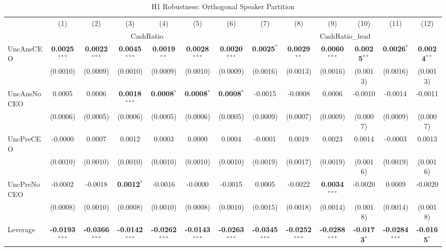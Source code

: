 \begin{landscape}
\begin{table}[H]
\setlength{\tabcolsep}{3pt}
\renewcommand{\arraystretch}{0.85}
\centering
\caption{H1 Robustness: Orthogonal Speaker Partition}
\label{tab:h1_robust}
\scriptsize
\begin{tabular}{lcccccccccccc}
\toprule
 & (1) & (2) & (3) & (4) & (5) & (6) & (7) & (8) & (9) & (10) & (11) & (12) \\
 & \multicolumn{6}{c}{CashRatio} & \multicolumn{6}{c}{CashRatio\_lead} \\
\cmidrule(lr){2-7} \cmidrule(lr){8-13}
\midrule
UncAnsCEO & \textbf{0.0025}$^{***}$ & \textbf{0.0022}$^{***}$ & \textbf{0.0045}$^{***}$ & \textbf{0.0019}$^{**}$ & \textbf{0.0028}$^{***}$ & \textbf{0.0020}$^{***}$ & \textbf{0.0025}$^{*}$ & \textbf{0.0029}$^{**}$ & \textbf{0.0060}$^{***}$ & \textbf{0.0025}$^{**}$ & \textbf{0.0026}$^{*}$ & \textbf{0.0024}$^{**}$ \\
 & (0.0010) & (0.0009) & (0.0010) & (0.0009) & (0.0010) & (0.0009) & (0.0016) & (0.0013) & (0.0016) & (0.0013) & (0.0016) & (0.0013) \\
UncAnsNoCEO & 0.0005 & 0.0006 & \textbf{0.0018}$^{***}$ & \textbf{0.0008}$^{*}$ & \textbf{0.0008}$^{*}$ & \textbf{0.0008}$^{*}$ & -0.0015 & -0.0008 & 0.0006 & -0.0010 & -0.0014 & -0.0011 \\
 & (0.0006) & (0.0005) & (0.0006) & (0.0005) & (0.0006) & (0.0005) & (0.0009) & (0.0007) & (0.0009) & (0.0007) & (0.0009) & (0.0007) \\
UncPreCEO & -0.0000 & 0.0007 & 0.0012 & 0.0003 & 0.0000 & 0.0004 & -0.0001 & 0.0019 & 0.0023 & 0.0014 & -0.0003 & 0.0013 \\
 & (0.0010) & (0.0010) & (0.0010) & (0.0010) & (0.0010) & (0.0010) & (0.0019) & (0.0017) & (0.0019) & (0.0016) & (0.0019) & (0.0016) \\
UncPreNoCEO & -0.0002 & -0.0018 & \textbf{0.0012}$^{*}$ & -0.0016 & -0.0000 & -0.0015 & 0.0005 & -0.0022 & \textbf{0.0034}$^{***}$ & -0.0020 & 0.0009 & -0.0020 \\
 & (0.0008) & (0.0010) & (0.0008) & (0.0010) & (0.0008) & (0.0010) & (0.0015) & (0.0018) & (0.0014) & (0.0018) & (0.0014) & (0.0018) \\
\midrule
Leverage & \textbf{-0.0193}$^{***}$ & \textbf{-0.0366}$^{***}$ & \textbf{-0.0142}$^{***}$ & \textbf{-0.0262}$^{***}$ & \textbf{-0.0143}$^{***}$ & \textbf{-0.0263}$^{***}$ & \textbf{-0.0345}$^{***}$ & \textbf{-0.0252}$^{***}$ & \textbf{-0.0288}$^{***}$ & \textbf{-0.0173}$^{*}$ & \textbf{-0.0284}$^{***}$ & \textbf{-0.0165}$^{*}$ \\

\end{tabular}
\end{table}
\end{landscape}

